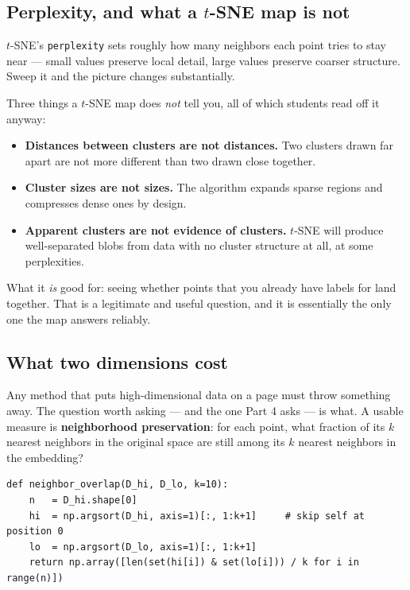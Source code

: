\documentclass[11pt]{article}
\begin{document}
\subsection{Perplexity, and what a $t$-SNE map is not}

$t$-SNE's \texttt{perplexity} sets roughly how many neighbors each point tries to
stay near --- small values preserve local detail, large values preserve coarser
structure. Sweep it and the picture changes substantially.

Three things a $t$-SNE map does \emph{not} tell you, all of which students read
off it anyway:

\begin{itemize}
  \item \textbf{Distances between clusters are not distances.} Two clusters
        drawn far apart are not more different than two drawn close together.
  \item \textbf{Cluster sizes are not sizes.} The algorithm expands sparse
        regions and compresses dense ones by design.
  \item \textbf{Apparent clusters are not evidence of clusters.} $t$-SNE will
        produce well-separated blobs from data with no cluster structure at all,
        at some perplexities.
\end{itemize}

What it \emph{is} good for: seeing whether points that you already have labels
for land together. That is a legitimate and useful question, and it is
essentially the only one the map answers reliably.

\subsection{What two dimensions cost}

Any method that puts high-dimensional data on a page must throw something away.
The question worth asking --- and the one Part 4 asks --- is what. A usable
measure is \textbf{neighborhood preservation}: for each point, what fraction of
its $k$ nearest neighbors in the original space are still among its $k$ nearest
neighbors in the embedding?

\begin{lstlisting}
def neighbor_overlap(D_hi, D_lo, k=10):
    n   = D_hi.shape[0]
    hi  = np.argsort(D_hi, axis=1)[:, 1:k+1]     # skip self at position 0
    lo  = np.argsort(D_lo, axis=1)[:, 1:k+1]
    return np.array([len(set(hi[i]) & set(lo[i])) / k for i in range(n)])
\end{lstlisting}
\end{document}
